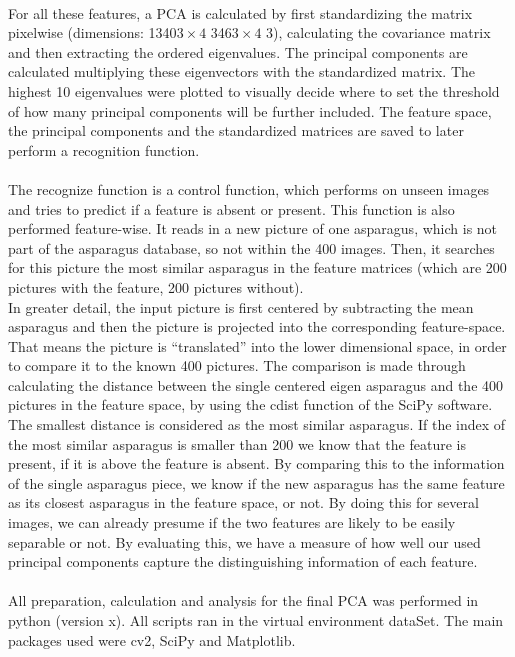 \\
For all these features, a PCA is calculated by first standardizing the matrix pixelwise (dimensions: 1340$3\times4$ 346$3\times4$ 3), calculating the covariance matrix and then extracting the ordered eigenvalues. The principal components are calculated multiplying these eigenvectors with the standardized matrix. The highest 10 eigenvalues were plotted to visually decide where to set the threshold of how many principal components will be further included. The feature space, the principal components and the standardized matrices are saved to later perform a recognition function. \\
\\
The recognize function is a control function, which performs on unseen images and tries to predict if a feature is absent or present. This function is also performed feature-wise. It reads in a new picture of one asparagus, which is not part of the asparagus database, so not within the 400 images. Then, it searches for this picture the most similar asparagus in the feature matrices (which are 200 pictures with the feature, 200 pictures without). \\
In greater detail, the input picture is first centered by subtracting the mean asparagus and then the picture is projected into the corresponding feature-space. That means the picture is “translated” into the lower dimensional space, in order to compare it to the known 400 pictures. The comparison is made through calculating the distance between the single centered eigen asparagus and the 400 pictures in the feature space, by using the cdist function of the SciPy software. The smallest distance is considered as the most similar asparagus. If the index of the most similar asparagus is smaller than 200 we know that the feature is present, if it is above the feature is absent. By comparing this to the information of the single asparagus piece, we know if the new asparagus has the same feature as its closest asparagus in the feature space, or not. By doing this for several images, we can already presume if the two features are likely to be easily separable or not. By evaluating this, we have a measure of how well our used principal components capture the distinguishing information of each feature. \\
\\
All preparation, calculation and analysis for the final PCA was performed in python (version x). All scripts ran in the virtual environment dataSet. The main packages used were cv2, SciPy and Matplotlib. \\

